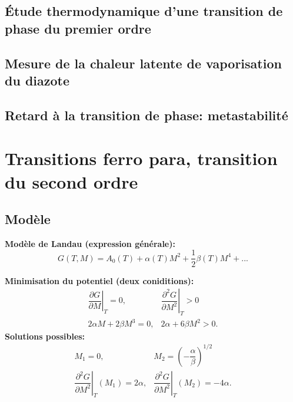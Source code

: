 \documentclass[10pt]{beamer}
\begin{document}
\subsection{Étude thermodynamique d'une transition de phase du premier ordre}
\subsection{Mesure de la chaleur latente de vaporisation du diazote}
\subsection{Retard à la transition de phase: metastabilité}
\section{Transitions ferro para, transition du second ordre}
\subsection{Modèle}
\begin{frame}{\insertsubsection}
    \textbf{Modèle de Landau (expression générale):}
    \begin{equation}
        G(T,M) = A_0(T)+\alpha(T)M^2+\frac{1}{2}\beta(T)M^4+...
    \end{equation}

    \textbf{Minimisation du potentiel (deux coniditions):}
    \begin{equation}
        \begin{array}{cc}
            \left. \dfrac{\partial G}{\partial M}\right|_T = 0, &\left. \dfrac{\partial^2G}{\partial M^2}\right|_T >0\\
            2\alpha M+2\beta M^3 = 0, & 2\alpha + 6\beta M^2 >0.
        \end{array}
    \end{equation}
    \textbf{Solutions possibles:} 
    \begin{equation}
        \begin{array}{cc}
            M_1=0,  & M_2=\left(-\dfrac{\alpha}{\beta}\right)^{1/2}\\
            \left. \dfrac{\partial^2 G}{\partial M^2}\right|_T (M_1)=2\alpha, & \left.\dfrac{\partial^2 G}{\partial M^2}\right|_T(M_2)=-4\alpha.
        \end{array}
    \end{equation}

\end{frame}
\end{document}
